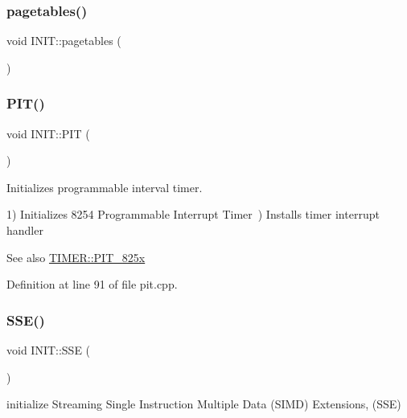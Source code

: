 \subsubsection{\texorpdfstring{pagetables()}{pagetables()}}
{\footnotesize\ttfamily void I\+N\+I\+T\+::pagetables (\begin{DoxyParamCaption}{ }\end{DoxyParamCaption})}

\mbox{\label{namespace_i_n_i_t_a6fa46ed9b50062458ede3692a4865c51}} 
\subsubsection{\texorpdfstring{P\+I\+T()}{PIT()}}
{\footnotesize\ttfamily void I\+N\+I\+T\+::\+P\+IT (\begin{DoxyParamCaption}{ }\end{DoxyParamCaption})}



Initializes programmable interval timer. 

1) Initializes 8254 Programmable Interrupt Timer~) Installs timer interrupt handler \begin{DoxySeeAlso}{See also}
\hyperlink{namespace_t_i_m_e_r_a9914c0026a4661367482a01e7834500e}{T\+I\+M\+E\+R\+::\+P\+I\+T\+\_\+825x} 
\end{DoxySeeAlso}


Definition at line 91 of file pit.\+cpp.

\mbox{\label{namespace_i_n_i_t_a8928ddbb4ca671dfe1c740da380fa0c4}} 
\subsubsection{\texorpdfstring{S\+S\+E()}{SSE()}}
{\footnotesize\ttfamily void I\+N\+I\+T\+::\+S\+SE (\begin{DoxyParamCaption}{ }\end{DoxyParamCaption})}



initialize Streaming Single Instruction Multiple Data (S\+I\+MD) Extensions, (S\+SE) 

